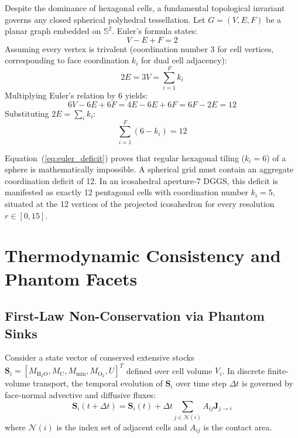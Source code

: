 \documentclass[10pt,twocolumn]{article}
\begin{document}
Despite the dominance of hexagonal cells, a fundamental topological invariant governs any closed spherical polyhedral tessellation. Let $G = (V, E, F)$ be a planar graph embedded on $\mathbb{S}^2$. Euler's formula states:
\begin{equation}
V - E + F = 2
\end{equation}
Assuming every vertex is trivalent (coordination number 3 for cell vertices, corresponding to face coordination $k_i$ for dual cell adjacency):
\begin{equation}
2E = 3V = \sum_{i=1}^{F} k_i
\end{equation}
Multiplying Euler's relation by 6 yields:
\begin{equation}
6V - 6E + 6F = 4E - 6E + 6F = 6F - 2E = 12
\end{equation}
Substituting $2E = \sum_i k_i$:
\begin{equation}
\sum_{i=1}^{F} (6 - k_i) = 12
\label{eq:euler_deficit}
\end{equation}

Equation~(\ref{eq:euler_deficit}) proves that regular hexagonal tiling ($k_i = 6$) of a sphere is mathematically impossible. A spherical grid must contain an aggregate coordination deficit of 12. In an icosahedral aperture-7 DGGS, this deficit is manifested as exactly 12 pentagonal cells with coordination number $k_i = 5$, situated at the 12 vertices of the projected icosahedron for every resolution $r \in [0, 15]$.

\section{Thermodynamic Consistency and Phantom Facets}

\subsection{First-Law Non-Conservation via Phantom Sinks}

Consider a state vector of conserved extensive stocks $\mathbf{S}_i = [M_{\text{H}_2\text{O}}, M_{\text{C}}, M_{\text{min}}, M_{\text{O}_2}, U]^T$ defined over cell volume $V_i$. In discrete finite-volume transport, the temporal evolution of $\mathbf{S}_i$ over time step $\Delta t$ is governed by face-normal advective and diffusive fluxes:
\begin{equation}
\mathbf{S}_i(t + \Delta t) = \mathbf{S}_i(t) + \Delta t \sum_{j \in \mathcal{N}(i)} A_{ij} \mathbf{J}_{j \to i}
\end{equation}
where $\mathcal{N}(i)$ is the index set of adjacent cells and $A_{ij}$ is the contact area.
\end{document}
